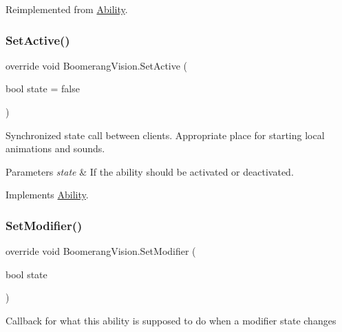 Reimplemented from \hyperlink{class_ability_ae659b58f49f07191c1d269fc3ba59c7e}{Ability}.

\hypertarget{class_boomerang_vision_a57466383cc537a290ddc4e4fcf7a4c35}{}\label{class_boomerang_vision_a57466383cc537a290ddc4e4fcf7a4c35} 
\subsubsection{\texorpdfstring{Set\+Active()}{SetActive()}}
{\footnotesize\ttfamily override void Boomerang\+Vision.\+Set\+Active (\begin{DoxyParamCaption}\item[{bool}]{state = {\ttfamily false} }\end{DoxyParamCaption})\hspace{0.3cm}{\ttfamily [virtual]}}



Synchronized state call between clients. Appropriate place for starting local animations and sounds. 


\begin{DoxyParams}{Parameters}
{\em state} & If the ability should be activated or deactivated.\\
\hline
\end{DoxyParams}


Implements \hyperlink{class_ability_a10f7f3c2b63eeef6e352aee48d246384}{Ability}.

\hypertarget{class_boomerang_vision_a3fff30008efe643eeee867fad5c68b06}{}\label{class_boomerang_vision_a3fff30008efe643eeee867fad5c68b06} 
\subsubsection{\texorpdfstring{Set\+Modifier()}{SetModifier()}}
{\footnotesize\ttfamily override void Boomerang\+Vision.\+Set\+Modifier (\begin{DoxyParamCaption}\item[{bool}]{state }\end{DoxyParamCaption})\hspace{0.3cm}{\ttfamily [virtual]}}



Callback for what this ability is supposed to do when a modifier state changes 


